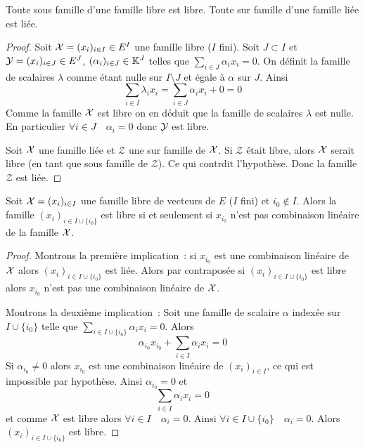 \begin{prop}
  Toute sous famille d'une famille libre est libre. Toute sur famille d'une famille liée est liée.
\end{prop}
\begin{proof}
  Soit \(\mathcal{X}=(x_i)_{i \in I} \in E^I\) une famille libre (\(I\) fini). Soit \(J \subset I\) et \(\mathcal{Y}=(x_i)_{i \in J} \in E^J\), \((\alpha_i)_{i \in J} \in \mathbb{K}^J\) telles que \(\sum_{i \in J} \alpha_i x_i =0\). On définit la famille de scalaires \(\lambda\) comme étant nulle sur \(I\setminus J\) et égale à \(\alpha\) sur \(J\). Ainsi
\begin{equation}
  \sum_{i \in I} \lambda_i x_i = \sum_{i \in J} \alpha_i x_i +0 =0
\end{equation}
Comme la famille \(\mathcal{X}\) est libre on en déduit que la famille de scalaires \(\lambda\) est nulle. En particulier \(\forall i \in J \quad \alpha_i = 0\) donc \(\mathcal{Y}\) est libre.

Soit \(\mathcal{X}\) une famille liée et \(\mathcal{Z}\) une sur famille de \(\mathcal{X}\). Si \(\mathcal{Z}\) était libre, alors \(\mathcal{X}\) serait libre (en tant que sous famille de \(\mathcal{Z}\)). Ce qui contrdit l'hypothèse. Donc la famille \(\mathcal{Z}\) est liée. 
\end{proof}

\begin{prop}
  Soit \(\mathcal{X}=(x_i)_{i \in I}\) une famille libre de vecteurs de \(E\) (\(I\) fini) et \(i_0 \notin I\). Alors la famille \((x_i)_{i \in I \cup \{i_0\}}\) est libre si et seulement si \(x_{i_0}\) n'est pas combinaison linéaire de la famille \(\mathcal{X}\).
\end{prop}
\begin{proof}
 Montrons la première implication~: si \(x_{i_0}\) est une combinaison linéaire de \(\mathcal{X}\) alors \((x_i)_{i \in I \cup \{i_0\}}\) est liée. Alors par contraposée si \((x_i)_{i \in I \cup \{i_0\}}\) est libre alors \(x_{i_0}\) n'est pas une combinaison linéaire de \(\mathcal{X}\).

  Montrons la deuxième implication~: Soit une famille de scalaire \(\alpha\) indexée sur \(I \cup\{i_0\}\) telle que \(\sum_{i \in I \cup\{i_0\}} \alpha_i x_i =0\). Alors
  \begin{equation}
    \alpha_{i_0} x_{i_0} + \sum_{i \in I} \alpha_i x_i =0
  \end{equation}
  Si \(\alpha_{i_0} \neq 0\) alors \(x_{i_0}\) est une combinaison linéaire de \((x_i)_{i \in I}\), ce qui est impossible par hypothèse. Ainsi \(\alpha_{i_0} = 0\) et 
  \begin{equation}
    \sum_{i \in I} \alpha_i x_i =0
  \end{equation}
  et comme \(\mathcal{X}\) est libre alors \(\forall i \in I \quad \alpha_i=0\). Ainsi \(\forall i \in I\cup\{i_0\} \quad \alpha_i=0\). Alors \((x_i)_{i \in I \cup \{i_0\}}\) est libre.
\end{proof}

